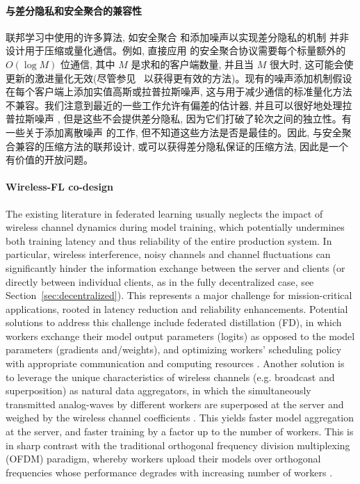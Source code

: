 \paragraph*{与差分隐私和安全聚合的兼容性}联邦学习中使用的许多算法, 如安全聚合 \citep{bonawitz2016practical} 和添加噪声以实现差分隐私的机制 \citep{abadi2016deep,mcmahan18dplm} 并非设计用于压缩或量化通信。例如, 直接应用 \citet{bonawitz17secagg,bell20secagg} 的安全聚合协议需要每个标量额外的 $O(\log M)$ 位通信, 其中 $M$ 是求和的客户端数量, 并且当 $M$ 很大时, 这可能会使更新的激进量化无效(尽管参见~\cite{bonawitz2019autotune} 以获得更有效的方法)。现有的噪声添加机制假设在每个客户端上添加实值高斯或拉普拉斯噪声, 这与用于减少通信的标准量化方法不兼容。我们注意到最近的一些工作允许有偏差的估计器, 并且可以很好地处理拉普拉斯噪声 \cite{stich2019error}, 但是这些不会提供差分隐私, 因为它们打破了轮次之间的独立性。有一些关于添加离散噪声 \cite{agarwal2018cpsgd} 的工作, 但不知道这些方法是否是最佳的。因此, 与安全聚合兼容的压缩方法的联邦设计, 或可以获得差分隐私保证的压缩方法, 因此是一个有价值的开放问题。


\paragraph{Wireless-FL co-design}

The existing literature in federated learning usually neglects the impact of wireless channel dynamics during model training, which potentially undermines both training latency and thus reliability of the entire production system. In particular, wireless interference, noisy channels and channel fluctuations can significantly hinder the information exchange between the server and clients (or directly between individual clients, as in the fully decentralized case, see Section~\ref{sec:decentralized}). This represents a major challenge for mission-critical applications, rooted in latency reduction and reliability enhancements. Potential solutions to address this challenge include federated distillation (FD), in which workers exchange their model output parameters (logits) as opposed to the model parameters (gradients and/weights),  and optimizing workers' scheduling policy with appropriate communication and computing resources \citep{FD, EdgeML, FL5G}. Another solution is to leverage the unique characteristics of wireless channels (e.g. broadcast and superposition) as natural data aggregators, in which the simultaneously transmitted  analog-waves  by different workers are  superposed at the server and weighed by the wireless channel coefficients \citep{AbariRK16}. This yields faster model aggregation at the server, and faster training by a factor up to the number of workers. This is in sharp contrast with the traditional orthogonal frequency division  multiplexing (OFDM) paradigm, whereby workers upload their models over orthogonal frequencies whose performance degrades with increasing number of workers \cite{elgabli2020harnessing}.

